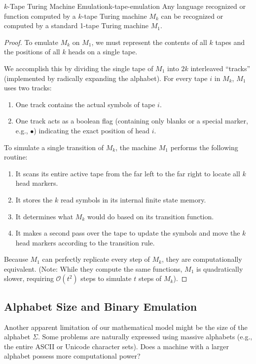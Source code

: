 \begin{theorem}{\(k\)-Tape Turing Machine Emulation}{k-tape-emulation}
    Any language recognized or function computed by a \(k\)-tape Turing machine \(M_k\) can be recognized or computed by a standard 1-tape Turing machine \(M_1\). 
    \begin{proof}
        To emulate \(M_k\) on \(M_1\), we must represent the contents of all \(k\) tapes and the positions of all \(k\) heads on a single tape. 
        
        We accomplish this by dividing the single tape of \(M_1\) into \(2k\) interleaved ``tracks'' (implemented by radically expanding the alphabet). For every tape \(i\) in \(M_k\), \(M_1\) uses two tracks:
        \begin{enumerate}
            \item One track contains the actual symbols of tape \(i\).
            \item One track acts as a boolean flag (containing only blanks or a special marker, e.g., \(\bullet\)) indicating the exact position of head \(i\).
        \end{enumerate}
        
        To simulate a single transition of \(M_k\), the machine \(M_1\) performs the following routine:
        \begin{enumerate}
            \item It scans its entire active tape from the far left to the far right to locate all \(k\) head markers.
            \item It stores the \(k\) read symbols in its internal finite state memory.
            \item It determines what \(M_k\) would do based on its transition function.
            \item It makes a second pass over the tape to update the symbols and move the \(k\) head markers according to the transition rule.
        \end{enumerate}
        Because \(M_1\) can perfectly replicate every step of \(M_k\), they are computationally equivalent. (Note: While they compute the same functions, \(M_1\) is quadratically slower, requiring \(\mathcal{O}(t^2)\) steps to simulate \(t\) steps of \(M_k\)).
    \end{proof}
\end{theorem}

\subsection{Alphabet Size and Binary Emulation}
Another apparent limitation of our mathematical model might be the size of the alphabet \(\Sigma\). Some problems are naturally expressed using massive alphabets (e.g., the entire ASCII or Unicode character sets). Does a machine with a larger alphabet possess more computational power?

